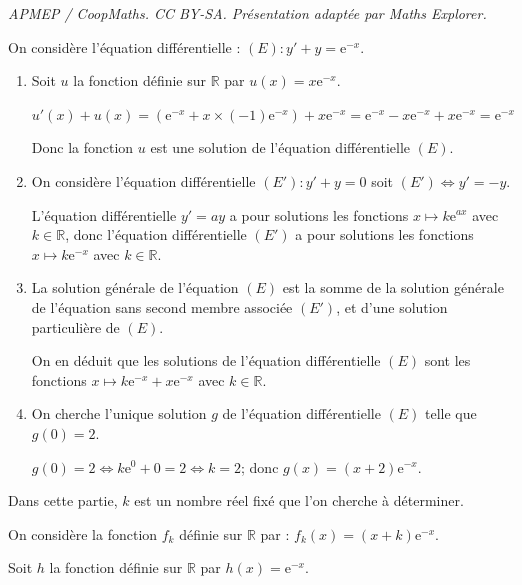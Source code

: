 \documentclass[10pt]{article}
\providecommand{\R}{\mathbb{R}}
\providecommand{\e}{{\mathrm{e}}}
\begin{document}
\noindent\textit{APMEP / CoopMaths. CC BY-SA. Présentation adaptée par Maths Explorer.}\par\medskip
\medskip


\medskip


On considère l'équation différentielle :  $(E): y' + y = \e^{-x}$.

\begin{enumerate}
\item Soit $u$ la fonction définie sur $\R$ par $u(x) = x \e^{-x}$.


$u'(x)+u(x)=\left (\e^{-x}+x\times (-1)\e^{-x}\right )+x\e^{-x}
=\e^{-x}-x\e^{-x} + x\e^{-x} = \e^{-x}$

Donc  la fonction $u$ est une solution de l'équation différentielle $(E)$.

\item On considère l'équation différentielle $\left(E'\right): y' + y = 0$ soit $\left(E'\right) \iff y'=-y$.

L'équation différentielle $y'=ay$ a pour solutions les fonctions $x \longmapsto k\e^{ax}$ avec \mbox{$k\in\R$}, donc l'équation différentielle $\left(E'\right)$ a pour solutions les fonctions $x \longmapsto k\e^{-x}$ avec $k\in\R$.

\item 
La solution générale de l'équation $(E)$ est la somme de la solution générale de l'équation sans second membre associée $(E')$, et d'une solution particulière de $(E)$.

On en déduit que les solutions de l'équation différentielle $(E)$ sont les fonctions $x \longmapsto k\e^{-x} + x\e^{-x}$ avec $k\in\R$.

\item On cherche l'unique solution $g$ de l'équation différentielle $(E)$ telle que $g(0) = 2$.

$g(0)=2 \iff k\e^{0}+0=2 \iff k=2$; donc $g(x)=(x+2)\e^{-x}$.
\end{enumerate}


\medskip


\medskip


Dans cette partie, $k$ est un nombre réel fixé que l'on cherche à déterminer.

On considère la fonction $f_{k}$ définie sur $\R$ par : $f_{k}(x) = (x + k) \e^{-x}.$

Soit $h$ la fonction définie sur $\R$ par $h(x) = \e^{-x}.$
\end{document}
